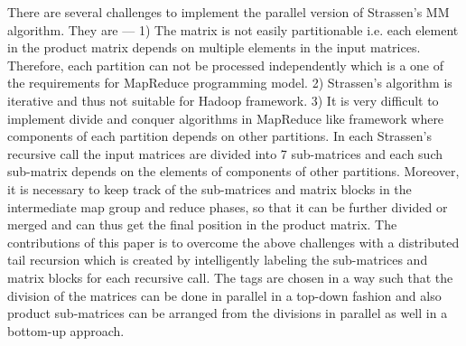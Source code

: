 There are several challenges to implement the parallel version of Strassen's MM algorithm. They are --- 1) The matrix is not easily partitionable i.e. each element in the product matrix depends on multiple elements in the input matrices. Therefore, each partition can not be processed independently which is a one of the requirements for MapReduce programming model. 2) Strassen's algorithm is iterative and thus not suitable for Hadoop framework. 3) It is very difficult to implement divide and conquer algorithms in MapReduce like framework where components of each partition depends on other partitions. In each Strassen's recursive call the input matrices are divided into 7 sub-matrices and each such sub-matrix depends on the elements of components of other partitions. Moreover, it is necessary to keep track of the sub-matrices and matrix blocks in the intermediate map group and reduce phases, so that it can be further divided or merged and can thus get the final position in the product matrix. The contributions of this paper is to overcome the above challenges with a distributed tail recursion which is created by intelligently labeling the sub-matrices and matrix blocks for each recursive call. The tags are chosen in a way such that the division of the matrices can be done in parallel in a top-down fashion and also product sub-matrices can be arranged from the divisions in parallel as well in a bottom-up approach.



